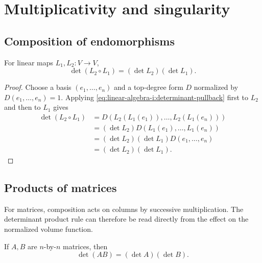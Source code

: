 \section{Multiplicativity and singularity}
\label{sec:linear-algebra-i:multiplicativity-and-singularity}

\subsection{Composition of endomorphisms}

\begin{theorem}
  \label{thm:linear-algebra-i:determinant-composition}
  For linear maps \(L_1,L_2:V\to V\),
  \[
    \det(L_2\circ L_1)=(\det L_2)(\det L_1).
  \]
\end{theorem}

\begin{proof}
  Choose a basis \((e_1,\ldots,e_n)\) and a top-degree form \(D\)
  normalized by \(D(e_1,\ldots,e_n)=1\). Applying
  \autoref{eq:linear-algebra-i:determinant-pullback} first to \(L_2\)
  and then to \(L_1\) gives
  \begin{align*}
    \det(L_2\circ L_1)
      &=D(L_2(L_1(e_1)),\ldots,L_2(L_1(e_n)))\\
      &=(\det L_2)D(L_1(e_1),\ldots,L_1(e_n))\\
      &=(\det L_2)(\det L_1)D(e_1,\ldots,e_n)\\
      &=(\det L_2)(\det L_1).
  \end{align*}
\end{proof}

\subsection{Products of matrices}

For matrices, composition acts on columns by successive multiplication.
The determinant product rule can therefore be read directly from the
effect on the normalized volume function.

\begin{theorem}
  \label{thm:linear-algebra-i:determinant-product}
  If \(A,B\) are \(n\)-by-\(n\) matrices, then
  \[
    \det(AB)=(\det A)(\det B).
  \]
\end{theorem}

